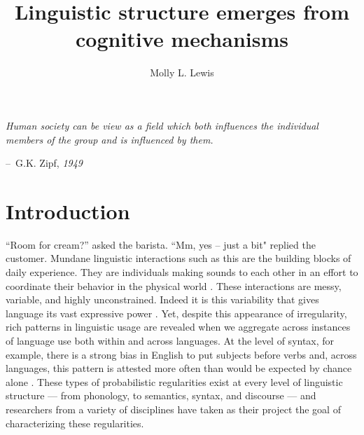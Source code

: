 \documentclass[man, noapacite, 12pt]{apa2}
\title{Linguistic structure emerges from cognitive mechanisms}
\author{Molly L. Lewis}
\affiliation{Department of Psychology, Stanford University\\ Conceptual Analysis of Dissertation Area\\ 6 October 2014}
\makeatletter
\newenvironment{chapquote}[2][2em]
  {\setlength{\@tempdima}{#1}%
   \def\chapquote@author{#2}%
   \parshape 1 \@tempdima \dimexpr\textwidth-2\@tempdima\relax%
   \itshape}
  {\par\normalfont\hfill--\ \chapquote@author\hspace*{\@tempdima}\par\bigskip}
\makeatother
\begin{document}
\maketitle


\begin{chapquote}{G.K. Zipf, \textit{1949}}
\noindent  Human society can be view as a field which both influences the individual members of the group and is influenced by them. 
\end{chapquote}

\section{Introduction}
``Room for cream?'' asked the barista. ``Mm, yes -- just a bit" replied the customer. Mundane linguistic interactions such as this are the building blocks of daily experience. They are individuals making sounds to each other in an effort to coordinate their behavior in the physical world \cite{clark2006social}. These interactions are messy, variable, and highly unconstrained. Indeed it is this variability that gives language its vast expressive power \cite{hockett1960}. Yet, despite this appearance of irregularity, rich patterns in linguistic usage are revealed when we aggregate across instances of language use both within and across languages. At the level of syntax, for example, there is a strong bias in English to put subjects before verbs and, across languages, this pattern is attested more often than would be expected by chance alone  \cite{dryer2005order}. These types of probabilistic regularities exist at every level of linguistic structure --- from phonology, to semantics, syntax, and discourse --- and researchers from a variety of disciplines have taken as their project the goal of characterizing these regularities.
\end{document}
